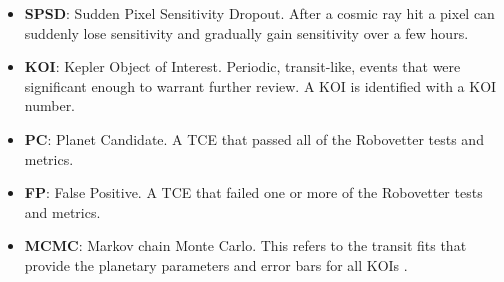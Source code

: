 \begin{itemize}
\item[] \textbf{SPSD}: Sudden Pixel Sensitivity Dropout.  After a cosmic ray hit a pixel can suddenly lose sensitivity and gradually gain sensitivity over a few hours.
\item[] \textbf{KOI}: Kepler Object of Interest. Periodic, transit-like, events that were significant enough to warrant further review. A KOI is identified with a KOI number.
\item[] \textbf{PC}: Planet Candidate. A TCE that passed all of the Robovetter tests and metrics.  
\item[] \textbf{FP}: False Positive. A TCE that failed one or more of the Robovetter tests and metrics.
\item[] \textbf{MCMC}: Markov chain Monte Carlo. This refers to the transit fits that provide the planetary parameters and error bars for all KOIs \citep{Hoffman2017}.



\end{itemize}